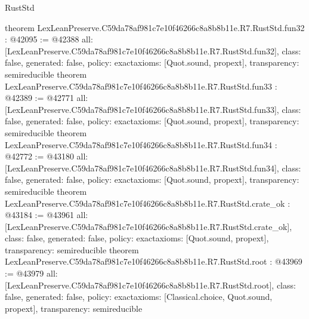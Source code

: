 \begin{lexlean}{RustStd}
\begin{coremodule}
{}
theorem LexLeanPreserve.C59da78af981c7e10f46266c8a8b8b11e.R7.RustStd.fun32 : @42095 := @42388 {
  all: [LexLeanPreserve.C59da78af981c7e10f46266c8a8b8b11e.R7.RustStd.fun32],
  class: false,
  generated: false,
  policy: exact{axioms: [Quot.sound, propext]},
  transparency: semireducible
}
theorem LexLeanPreserve.C59da78af981c7e10f46266c8a8b8b11e.R7.RustStd.fun33 : @42389 := @42771 {
  all: [LexLeanPreserve.C59da78af981c7e10f46266c8a8b8b11e.R7.RustStd.fun33],
  class: false,
  generated: false,
  policy: exact{axioms: [Quot.sound, propext]},
  transparency: semireducible
}
theorem LexLeanPreserve.C59da78af981c7e10f46266c8a8b8b11e.R7.RustStd.fun34 : @42772 := @43180 {
  all: [LexLeanPreserve.C59da78af981c7e10f46266c8a8b8b11e.R7.RustStd.fun34],
  class: false,
  generated: false,
  policy: exact{axioms: [Quot.sound, propext]},
  transparency: semireducible
}
theorem LexLeanPreserve.C59da78af981c7e10f46266c8a8b8b11e.R7.RustStd.crate_ok : @43184 := @43961 {
  all: [LexLeanPreserve.C59da78af981c7e10f46266c8a8b8b11e.R7.RustStd.crate_ok],
  class: false,
  generated: false,
  policy: exact{axioms: [Quot.sound, propext]},
  transparency: semireducible
}
theorem LexLeanPreserve.C59da78af981c7e10f46266c8a8b8b11e.R7.RustStd.root : @43969 := @43979 {
  all: [LexLeanPreserve.C59da78af981c7e10f46266c8a8b8b11e.R7.RustStd.root],
  class: false,
  generated: false,
  policy: exact{axioms: [Classical.choice, Quot.sound, propext]},
  transparency: semireducible
}


\end{coremodule}
\end{lexlean}
